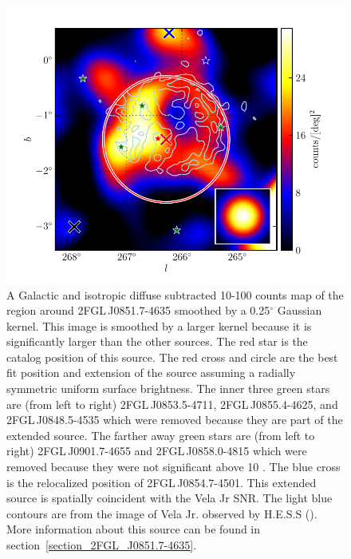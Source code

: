 \documentclass[12pt,preprint]{aastex}
\newcommand{\gev}{\text{GeV}\xspace}
\newcommand{\tev}{\text{TeV}\xspace}
\renewcommand{\deg}{\ensuremath{^\circ}\xspace}
\begin{document}
\begin{figure}
  \begin{center}
    \includegraphics[type=pdf,ext=.pdf,read=.pdf]{source_plots/source_Vela_Jr}
  \end{center}
  \caption{A Galactic and isotropic diffuse subtracted 10-100
  \gev counts map of the region around 2FGL\,J0851.7-4635 smoothed
  by a 0.25\deg Gaussian kernel. This image is smoothed by a larger
  kernel because it is significantly larger than the other sources.
  The red star is the catalog position of this source.  The red cross
  and circle are the best fit position and extension of the source
  assuming a radially
  symmetric uniform surface brightness.  The inner three green stars
  are (from left to right) 2FGL\,J0853.5-4711, 2FGL\,J0855.4-4625,
  and 2FGL\,J0848.5-4535 which were removed because they are part of
  the extended source.  The farther away green stars are (from left to
  right) 2FGL\,J0901.7-4655 and 2FGL\,J0858.0-4815 which were removed
  because they were not significant above 10 \gev.  The blue cross
  is the relocalized position of 2FGL\,J0854.7-4501.  This extended
  source is spatially coincident with the Vela Jr SNR.  The light
  blue contours are from the \tev image of Vela Jr. observed by H.E.S.S
  (\cite{vela_jr_hess}).  More information about this source can be
  found in section~\ref{section_2FGL_J0851.7-4635}.
  }\label{Vela_Jr}
\end{figure}
\end{document}
